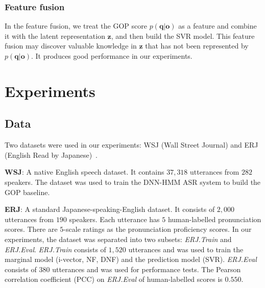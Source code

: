 \documentclass[a4paper]{article}
\begin{document}
%
%
%


\subsubsection{Feature fusion}

In the feature fusion, we treat the GOP score $p(\mathbf{q}|\mathbf{o})$ as a feature and combine it with the
latent representation $\mathbf{z}$, and then build the SVR model. This feature fusion may discover
valuable knowledge in $\mathbf{z}$ that has not been represented by $p(\mathbf{q}|\mathbf{o})$.
It produces good performance in our experiments.


\section{Experiments}
\label{sec:exp}

\subsection{Data}

Two datasets were used in our experiments: WSJ (Wall Street Journal) and ERJ (English Read by Japanese)~\cite{minematsu2004development}.

\noindent \textbf{WSJ}: A native English speech dataset. It contains $37,318$ utterances from $282$ speakers.
The dataset was used to train the DNN-HMM ASR system to build the GOP baseline.

\noindent \textbf{ERJ}: A standard Japanese-speaking-English dataset.
It consists of $2,000$ utterances from $190$ speakers.
Each utterance has $5$ human-labelled pronunciation scores.
There are $5$-scale ratings as the pronunciation proficiency scores.
In our experiments, the dataset was separated into two subsets: \emph{ERJ.Train} and \emph{ERJ.Eval}.
\emph{ERJ.Train} consists of $1,520$ utterances and was used to train the marginal model (i-vector, NF, DNF) and the prediction model (SVR).
\emph{ERJ.Eval} consists of $380$ utterances and was used for performance tests.
The Pearson correlation coefficient (PCC) on \emph{ERJ.Eval} of human-labelled scores is $0.550$.

%
%
%
\end{document}
